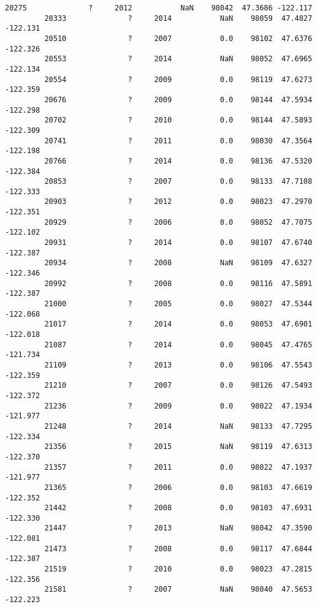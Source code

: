 \documentclass[11pt]{article}
\begin{document}
\begin{Verbatim}[commandchars=\\\{\}]
         20275              ?     2012           NaN    98042  47.3686 -122.117   
         20333              ?     2014           NaN    98059  47.4827 -122.131   
         20510              ?     2007           0.0    98102  47.6376 -122.326   
         20553              ?     2014           NaN    98052  47.6965 -122.134   
         20554              ?     2009           0.0    98119  47.6273 -122.359   
         20676              ?     2009           0.0    98144  47.5934 -122.298   
         20702              ?     2010           0.0    98144  47.5893 -122.309   
         20741              ?     2011           0.0    98030  47.3564 -122.198   
         20766              ?     2014           0.0    98136  47.5320 -122.384   
         20853              ?     2007           0.0    98133  47.7108 -122.333   
         20903              ?     2012           0.0    98023  47.2970 -122.351   
         20929              ?     2006           0.0    98052  47.7075 -122.102   
         20931              ?     2014           0.0    98107  47.6740 -122.387   
         20934              ?     2008           NaN    98109  47.6327 -122.346   
         20992              ?     2008           0.0    98116  47.5891 -122.387   
         21000              ?     2005           0.0    98027  47.5344 -122.068   
         21017              ?     2014           0.0    98053  47.6901 -122.018   
         21087              ?     2014           0.0    98045  47.4765 -121.734   
         21109              ?     2013           0.0    98106  47.5543 -122.359   
         21210              ?     2007           0.0    98126  47.5493 -122.372   
         21236              ?     2009           0.0    98022  47.1934 -121.977   
         21248              ?     2014           NaN    98133  47.7295 -122.334   
         21356              ?     2015           NaN    98119  47.6313 -122.370   
         21357              ?     2011           0.0    98022  47.1937 -121.977   
         21365              ?     2006           0.0    98103  47.6619 -122.352   
         21442              ?     2008           0.0    98103  47.6931 -122.330   
         21447              ?     2013           NaN    98042  47.3590 -122.081   
         21473              ?     2008           0.0    98117  47.6844 -122.387   
         21519              ?     2010           0.0    98023  47.2815 -122.356   
         21581              ?     2007           NaN    98040  47.5653 -122.223   
         

\end{Verbatim}
\end{document}
